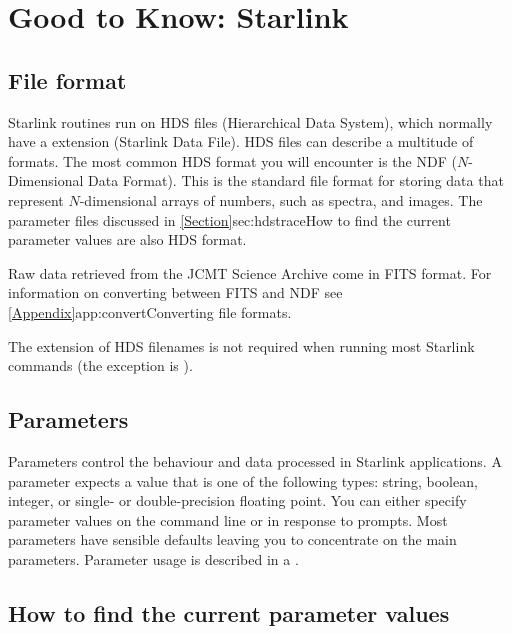 \documentclass[11pt,oneside,chapters]{starlink}
\begin{document}
\newpage
\chapter{Good to Know: Starlink}
\label{sec:starlink}

\section{File format}
\label{sec:format}

Starlink routines run on HDS files (Hierarchical Data System), which
normally have a  extension (Starlink Data File).
HDS files can describe a multitude of formats. The most common HDS
format you will encounter is the NDF ($N$-Dimensional Data
Format)\cite{ssds}. This is the standard file format for storing data
that represent $N$-dimensional arrays of numbers, such as spectra, and
images.  The parameter files discussed in
\cref{Section}{sec:hdstrace}{How to find the current parameter values}
are also HDS format.

Raw data retrieved from the JCMT Science Archive come in FITS format.
For information on converting between FITS and NDF see
\cref{Appendix}{app:convert}{Converting file formats}.

\begin{tip}
The  extension of HDS filenames is not required when running
most Starlink commands (the exception is \picard).
\end{tip}

\section{Parameters}
\label{sec:parameters}

Parameters control the behaviour and data processed in Starlink
applications.  A parameter expects a value that is one of the
following types: string, boolean, integer, or single- or
double-precision floating point.  You can either specify parameter
values on the command line or in response to prompts.  Most parameters
have sensible defaults leaving you to concentrate on the main
parameters.  Parameter usage is described in a
.

\section{How to find the current parameter values}
\label{sec:hdstrace}
\end{document}
